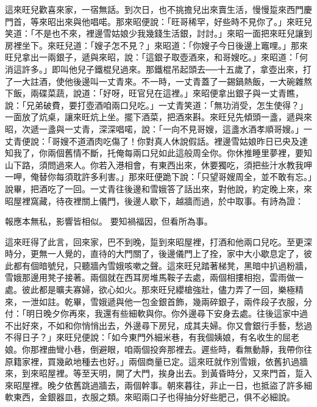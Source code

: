 這來旺兒歡喜來家，一宿無話。到次日，也不挑擔兒出來賣生活，慢慢踅來西門慶門首，等來昭出來與他唱喏。那來昭便說：「旺哥稀罕，好些時不見你了。」來旺兒笑道：「不是也不來，裡邊雪姑娘少我幾錢生活銀，討討。」來昭一面把來旺兒讓到房裡坐下。來旺兒道：「嫂子怎不見？」來昭道：「你嫂子今日後邊上竈哩。」那來旺兒拿出一兩銀子，遞與來昭，說：「這銀子取壺酒來，和哥嫂吃。」來昭道：「何消這許多。」即叫他兒子鐵棍兒過來。那鐵棍吊起頭去──十五歲了，拿壺出來，打了一大註酒，使他後邊叫一丈青來。不一時，一丈青蓋了一錫鍋熱飯，一大碗雜熬下飯，兩碟菜蔬，說道：「好呀，旺官兒在這裡。」來昭便拿出銀子與一丈青瞧，說：「兄弟破費，要打壺酒咱兩口兒吃。」一丈青笑道：「無功消受，怎生使得？」一面放了炕桌，讓來旺炕上坐。擺下酒菜，把酒來斟。來旺兒先傾頭一盞，遞與來昭，次遞一盞與一丈青，深深唱喏，說：「一向不見哥嫂，這盞水酒孝順哥嫂。」一丈青便說：「哥嫂不道酒肉吃傷了！你對真人休說假話。裡邊雪姑娘昨日已央及達知我了，你兩個舊情不斷，托俺每兩口兒如此這般周全你。你休推睡里夢裡，要知山下路，須問過來人。你若入港相會，有東西出來，休要獨吃，須把些汁水教我呷一呷，俺替你每須耽許多利害。」那來旺便跪下說：「只望哥嫂周全，並不敢有忘。」說畢，把酒吃了一回。一丈青往後邊和雪娥答了話出來，對他說，約定晚上來，來昭屋裡窩藏，待夜裡關上儀門，後邊人歇下，越牆而過，於中取事。有詩為證：

報應本無私，影響皆相似。
要知禍福因，但看所為事。

這來旺得了此言，回來家，巴不到晚，踅到來昭屋裡，打酒和他兩口兒吃。至更深時分，更無一人覺的，直待的大門關了，後邊儀門上了拴，家中大小歇息定了，彼此都有個暗號兒，只聽牆內雪娥咳嗽之聲。這來旺兒踏著梯凳，黑暗中扒過粉牆，雪娥那邊用凳子接著。兩個就在西耳房堆馬鞍子去處，兩個相摟相抱，雲雨做一處。彼此都是曠夫寡婦，欲心如火。那來旺兒纓槍強壯，儘力弄了一回，樂極精來，一泄如註。乾畢，雪娥遞與他一包金銀首飾，幾兩碎銀子，兩件段子衣服，分付：「明日晚夕你再來，我還有些細軟與你。你外邊尋下安身去處。往後這家中過不出好來，不如和你悄悄出去，外邊尋下房兒，成其夫婦。你又會銀行手藝，愁過不得日子？」來旺兒便說：「如今東門外細米巷，有我個姨娘，有名收生的屈老娘。你那裡曲彎小巷，倒避眼，咱兩個投奔那裡去。遲些時，看無動靜，我帶你往原籍家裡，買幾畝地種去也好。」兩個商量已定。這來旺就作別雪娥，依舊扒過牆來，到來昭屋裡。等至天明，開了大門，挨身出去。到黃昏時分，又來門首，踅入來昭屋裡。晚夕依舊跳過牆去，兩個幹事。朝來暮往，非止一日，也抵盜了許多細軟東西，金銀器皿，衣服之類。來昭兩口子也得抽分好些肥己，俱不必細說。

